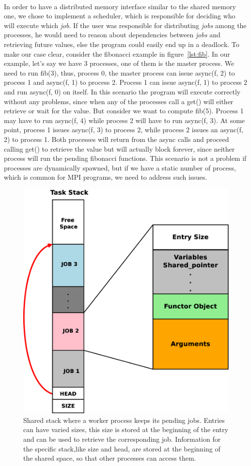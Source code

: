 \paragraph{}
In order to have a distributed memory interface similar to the shared memory one, we chose to implement 
a scheduler, which is responsible for deciding who will execute which \emph{job}.  If the user was 
responsible for distributing \emph{jobs} among the processes,  he would need to reason about dependencies
between \emph{jobs} and retrieving future values, else the program could easily end up in a deadlock.
To make our case clear, consider the fibonacci example in figure~\ref{lst:fib}.  
In our example, let's say we have
3 processes, one of them is the master process.  We need to run fib(3), thus, process 0, the master process 
can issue async(f, 2) to process 1 and async(f, 1) to process 2.  Process 1 can issue async(f, 1) to 
process 2 and run async(f, 0) on itself.  In this scenario the program will execute correctly without any
problems, since when any of the processes call a get() will either retrieve or wait for the value.  But 
consider we want to compute fib(5).  Process 1 may have to run async(f, 4) while process 2 will have to run
async(f, 3).  At some point, process 1 issues async(f, 3) to process 2, while process 2 issues an async(f, 2)
to process 1.  Both processes will return from the async calls and proceed calling get() to retrieve the value
but will actually block forever, since neither process will run the pending fibonacci functions.  This scenario
is not a problem if processes are dynamically spawned, but if we have a static number of process, which is
common for MPI programs, we need to address such issues.  

\begin{figure}[!ht]
\center
\includegraphics[width=0.5\columnwidth]{figures/task_stack}
\caption{Shared stack where a worker process keeps its pending jobs.  Entries can have varied sizes, this
size is stored at the beginning of the entry and can be used to retrieve the corresponding job.  Information
for the specific stack,like size and head, are stored at the beginning of the shared space, so that other
processes can access them.}
\label{fig:task_stack}
\end{figure}

